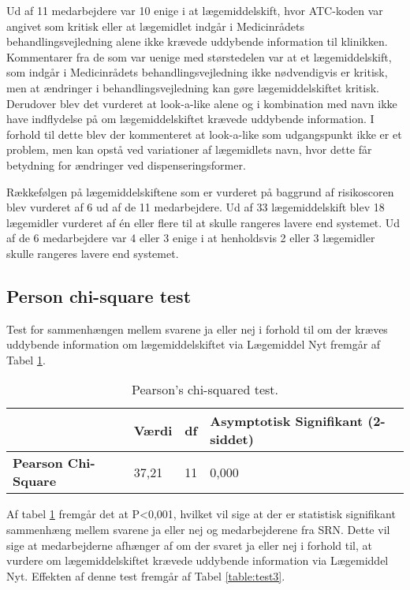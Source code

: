 Ud af 11 medarbejdere var 10 enige i at lægemiddelskift, hvor ATC-koden var angivet som kritisk eller at lægemidlet indgår i Medicinrådets behandlingsvejledning alene ikke krævede uddybende information til klinikken. Kommentarer fra de som var uenige med størstedelen var at et lægemiddelskift, som indgår i Medicinrådets behandlingsvejledning ikke nødvendigvis er kritisk, men at ændringer i behandlingsvejledning kan gøre lægemiddelskiftet kritisk. Derudover blev det vurderet at look-a-like alene og i kombination med navn ikke have indflydelse på om lægemiddelskiftet krævede uddybende information. I forhold til dette blev der kommenteret at look-a-like som udgangspunkt ikke er et problem, men kan opstå ved variationer af lægemidlets navn, hvor dette får betydning for ændringer ved dispenseringsformer.

Rækkefølgen på lægemiddelskiftene som er vurderet på baggrund af risikoscoren blev vurderet af 6 ud af de 11 medarbejdere. Ud af 33 lægemiddelskift blev 18 lægemidler vurderet af én eller flere til at skulle rangeres lavere end systemet. Ud af de 6 medarbejdere var 4 eller 3 enige i at henholdsvis 2 eller 3 lægemidler skulle rangeres lavere end systemet.


\subsection*{Person chi-square test}
Test for sammenhængen mellem svarene ja eller nej i forhold til om der kræves uddybende information om lægemiddelskiftet via Lægemiddel Nyt fremgår af Tabel \ref{table:test2}.

\begin{table}[H]
\caption{Pearson's chi-squared test.}
\vspace{2mm}
\label{table:test2}
\centering
\begin{tabular}{l|p{2cm}|p{2cm}|p{4.6cm}}
\cellcolor[HTML]{C0C0C0}\textbf{} & \cellcolor[HTML]{C0C0C0}\textbf{Værdi} & \cellcolor[HTML]{C0C0C0}\textbf{df} & \cellcolor[HTML]{C0C0C0}\textbf{Asymptotisk Signifikant (2-siddet)} \\ \hline
\cellcolor[HTML]{C0C0C0}\textbf{Pearson Chi-Square} & 37,21 & 11 & 0,000 \\
\end{tabular}
\end{table}

Af tabel \ref{table:test2} fremgår det at P<0,001, hvilket vil sige at der er statistisk signifikant sammenhæng mellem svarene ja eller nej og medarbejderene fra SRN. Dette vil sige at medarbejderne afhænger af om der svaret ja eller nej i forhold til, at vurdere om lægemiddelskiftet krævede uddybende information via Lægemiddel Nyt. Effekten af denne test fremgår af Tabel \ref{table:test3}.

